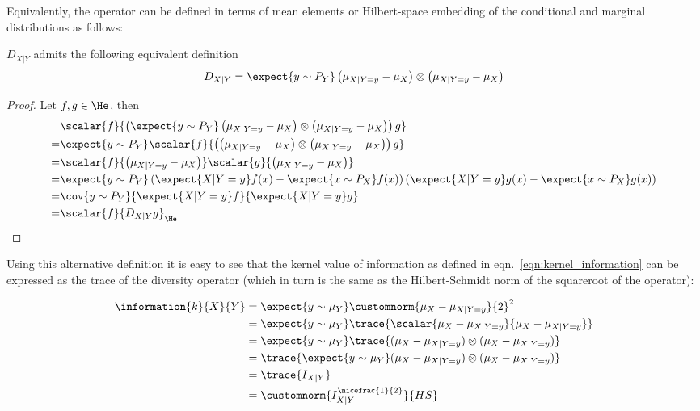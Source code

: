 Equivalently, the operator can be defined in terms of mean elements or Hilbert-space embedding of the conditional and marginal distributions as follows:

\begin{statement}
$D_{X\vert Y}$ admits the following equivalent definition
\begin{align}
	D_{X\vert Y} = \expect{y\sim P_Y} \left(\mu_{X\vert Y=y} - \mu_{X}\right) \otimes \left(\mu_{X\vert Y=y}  - \mu_{X} \right)
\end{align}

\begin{proof}
Let $f,g\in\He$, then
\begin{align}
	&\scalar{f}{ \left(\expect{y\sim P_Y}\left(\mu_{X\vert Y=y} - \mu_{X}\right) \otimes \left(\mu_{X\vert Y=y}  - \mu_{X} \right)\right) g}\\
	=&\expect{y\sim P_Y}\scalar{f}{ \left(\left(\mu_{X\vert Y=y} - \mu_{X}\right) \otimes \left(\mu_{X\vert Y=y}  - \mu_{X} \right)\right) g}\\
	=& \scalar{f}{\left(\mu_{X\vert Y=y} - \mu_{X}\right)}\scalar{g}{\left(\mu_{X\vert Y=y} - \mu_{X}\right)}\\
	=& \expect{y\sim P_Y} \left(\expect{X\vert Y=y} f(x) - \expect{x\sim P_X}f(x)\right)\left(\expect{X\vert Y=y} g(x) - \expect{x\sim P_X}g(x)\right)\\
	=& \cov{y\sim P_Y}{\expect{X\vert Y=y} f}{\expect{X\vert Y=y} g}\\
	=& \scalar{f}{D_{X\vert Y}g}_{\He}
\end{align}
\end{proof}
\end{statement}

Using this alternative definition it is easy to see that the kernel value of information as defined in eqn.\ \eqref{eqn:kernel_information} can be expressed as the trace of the diversity operator (which in turn is the same as the Hilbert-Schmidt norm of the squareroot of the operator):

\begin{align}
	\information{k}{X}{Y} &= \expect{y \sim \mu_{Y}} \customnorm{\mu_X - \mu_{X\vert Y=y}}{2}^2\\
		&= \expect{y \sim \mu_{Y}} \trace{\scalar{\mu_X - \mu_{X\vert Y=y}}{\mu_X - \mu_{X\vert Y=y}}}\\
		&= \expect{y \sim \mu_{Y}} \trace{ ( \mu_X - \mu_{X\vert Y=y}) \otimes (\mu_X - \mu_{X\vert Y=y})}\\
		&= \trace{ \expect{y \sim \mu_{Y}} ( \mu_X - \mu_{X\vert Y=y}) \otimes (\mu_X - \mu_{X\vert Y=y})} \\
		&= \trace{I_{X\vert Y}}\\
		&= \customnorm{I_{X\vert Y}^{\nicefrac{1}{2}}}{HS}
\end{align}

